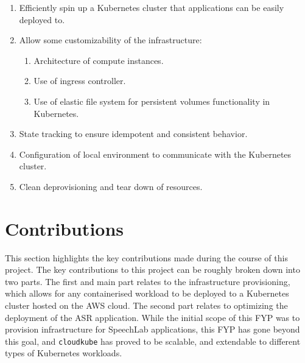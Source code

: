 \begin{enumerate}[label=\alph*., itemsep=0pt]
    \item Efficiently spin up a Kubernetes cluster that applications can be easily deployed to.
    \item Allow some customizability of the infrastructure:
    \vspace{-0.5em}
    \begin{enumerate}[label=\roman*., itemsep=0pt]
        \item Architecture of compute instances.
        \item Use of ingress controller.
        \item Use of elastic file system for persistent volumes functionality in Kubernetes.
    \end{enumerate}
    \item State tracking to ensure idempotent and consistent behavior.
    \item Configuration of local environment to communicate with the Kubernetes cluster.
    \item Clean deprovisioning and tear down of resources.
\end{enumerate}

\section{Contributions}
This section highlights the key contributions made during the course of this project. The key contributions to this project can be roughly broken down into two parts. 
The first and main part relates to the infrastructure provisioning, which allows for any containerised workload to be deployed to a Kubernetes cluster hosted on the AWS cloud. 
The second part relates to optimizing the deployment of the ASR application. While the initial scope of this FYP was to provision infrastructure
for SpeechLab applications, this FYP has gone beyond this goal, and \texttt{cloudkube} has proved to be scalable, and extendable to different
types of Kubernetes workloads.

